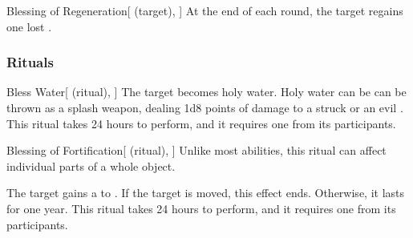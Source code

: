 \lowercase{\hypertarget{spell:Blessing of Regeneration}{}}\label{spell:Blessing of Regeneration}
\begin{attuneability}[Rank 7]{\hypertarget{spell:Blessing of Regeneration}{Blessing of Regeneration}}[ (target), ]
At the end of each round, the target regains one lost .

\end{attuneability}
\vspace{0.25em}



\subsubsection{Rituals}


\lowercase{\hypertarget{spell:Bless Water}{}}\label{spell:Bless Water}
\begin{attuneability}[Rank 1]{\hypertarget{spell:Bless Water}{Bless Water}}[ (ritual), ]
The target becomes holy water.
Holy water can be can be thrown as a splash weapon, dealing 1d8 points of damage to a struck  or an evil .
This ritual takes 24 hours to perform, and it requires one  from its participants.
\end{attuneability}
\vspace{0.25em}



\lowercase{\hypertarget{spell:Blessing of Fortification}{}}\label{spell:Blessing of Fortification}
\begin{attuneability}[Rank 1]{\hypertarget{spell:Blessing of Fortification}{Blessing of Fortification}}[ (ritual), ]
Unlike most abilities, this ritual can affect individual parts of a whole object.

The target gains a   to .
If the target is moved, this effect ends.
Otherwise, it lasts for one year.
This ritual takes 24 hours to perform, and it requires one  from its participants.
\end{attuneability}
\vspace{0.25em}



